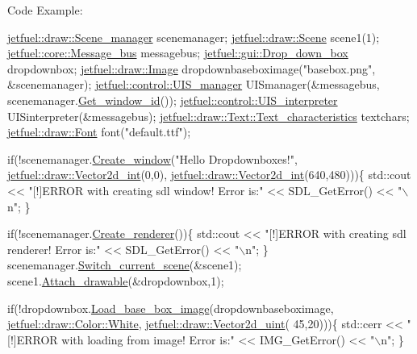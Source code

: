 Code Example\+: 
\begin{DoxyCode}
\hyperlink{classjetfuel_1_1draw_1_1Scene__manager}{jetfuel::draw::Scene\_manager} scenemanager;
\hyperlink{classjetfuel_1_1draw_1_1Scene}{jetfuel::draw::Scene} scene1(1);
\hyperlink{classjetfuel_1_1core_1_1Message__bus}{jetfuel::core::Message\_bus} messagebus;
\hyperlink{classjetfuel_1_1gui_1_1Drop__down__box}{jetfuel::gui::Drop\_down\_box} dropdownbox;
\hyperlink{classjetfuel_1_1draw_1_1Image}{jetfuel::draw::Image} dropdownbaseboximage(\textcolor{stringliteral}{"basebox.png"},
                                          &scenemanager);
\hyperlink{classjetfuel_1_1control_1_1UIS__manager}{jetfuel::control::UIS\_manager} UISmanager(&messagebus,
                                  scenemanager.\hyperlink{classjetfuel_1_1draw_1_1Scene__manager_a1758a86d40dcfaface8958fcd33676bf}{Get\_window\_id}());
\hyperlink{classjetfuel_1_1control_1_1UIS__interpreter}{jetfuel::control::UIS\_interpreter} UISinterpreter(&messagebus);
\hyperlink{structjetfuel_1_1draw_1_1Text_1_1Text__characteristics}{jetfuel::draw::Text::Text\_characteristics} textchars;
\hyperlink{classjetfuel_1_1draw_1_1Font}{jetfuel::draw::Font} font(\textcolor{stringliteral}{"default.ttf"});

\textcolor{keywordflow}{if}(!scenemanager.\hyperlink{classjetfuel_1_1draw_1_1Scene__manager_a5113e9062c272a22d383ba872417ba31}{Create\_window}(\textcolor{stringliteral}{"Hello Dropdownboxes!"},
                               \hyperlink{classjetfuel_1_1draw_1_1Vector2d}{jetfuel::draw::Vector2d\_int}(0,0),
                          \hyperlink{classjetfuel_1_1draw_1_1Vector2d}{jetfuel::draw::Vector2d\_int}(640,480)))\{
    std::cout << \textcolor{stringliteral}{"[!]ERROR with creating sdl window! Error is:"}
    << SDL\_GetError() << \textcolor{stringliteral}{"\(\backslash\)n"};
\}

\textcolor{keywordflow}{if}(!scenemanager.\hyperlink{classjetfuel_1_1draw_1_1Scene__manager_afafecd926ce5e4b2543a6d583a7d24b6}{Create\_renderer}())\{
    std::cout << \textcolor{stringliteral}{"[!]ERROR with creating sdl renderer! Error is:"}
    << SDL\_GetError() << \textcolor{stringliteral}{"\(\backslash\)n"};
\}
scenemanager.\hyperlink{classjetfuel_1_1draw_1_1Scene__manager_a770c163b88ba8427539ee182315ea989}{Switch\_current\_scene}(&scene1);
scene1.\hyperlink{classjetfuel_1_1draw_1_1Scene_aea4b4c4ae25c30d661be4c52787e0ea3}{Attach\_drawable}(&dropdownbox,1);

\textcolor{keywordflow}{if}(!dropdownbox.\hyperlink{classjetfuel_1_1gui_1_1Drop__down__box_a9624ef3b9af6d1e3e6fcebb7ef7aa17c}{Load\_base\_box\_image}(dropdownbaseboximage,
                                    \hyperlink{classjetfuel_1_1draw_1_1Color_ab75797c1cb6e4dd952037916db39b5e8}{jetfuel::draw::Color::White},
                                    \hyperlink{classjetfuel_1_1draw_1_1Vector2d}{jetfuel::draw::Vector2d\_uint}(
                                    45,20)))\{
    std::cerr << \textcolor{stringliteral}{"[!]ERROR with loading from image! Error is:"} <<
    IMG\_GetError() << \textcolor{stringliteral}{"\(\backslash\)n"};
\}


\end{DoxyCode}
